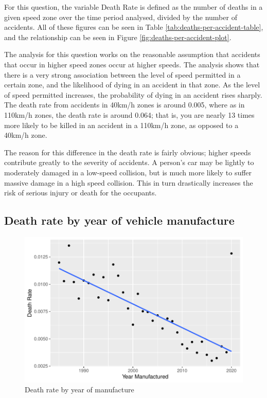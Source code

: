 \documentclass[11pt,a4paper,]{article}
\begin{document}
For this question, the variable Death Rate is defined as the number of deaths in a given speed zone over the time period analysed, divided by the number of accidents. All of these figures can be seen in Table \ref{tab:deaths-per-accident-table}, and the relationship can be seen in Figure \ref{fig:deaths-per-accident-plot}.

The analysis for this question works on the reasonable assumption that accidents that occur in higher speed zones occur at higher speeds. The analysis shows that there is a very strong association between the level of speed permitted in a certain zone, and the likelihood of dying in an accident in that zone. As the level of speed permitted increases, the probability of dying in an accident rises sharply. The death rate from accidents in 40km/h zones is around 0.005, where as in 110km/h zones, the death rate is around 0.064; that is, you are nearly 13 times more likely to be killed in an accident in a 110km/h zone, as opposed to a 40km/h zone.

The reason for this difference in the death rate is fairly obvious; higher speeds contribute greatly to the severity of accidents. A person's car may be lightly to moderately damaged in a low-speed collision, but is much more likely to suffer massive damage in a high speed collision. This in turn drastically increases the risk of serious injury or death for the occupants.

\subsection*{Death rate by year of vehicle manufacture}

\begin{figure}
\centering
\includegraphics{Report_files/figure-latex/plot-death-rate-by-year-manuf-1.pdf}
\caption{\label{fig:plot-death-rate-by-year-manuf}Death rate by year of manufacture}
\end{figure}
\end{document}
